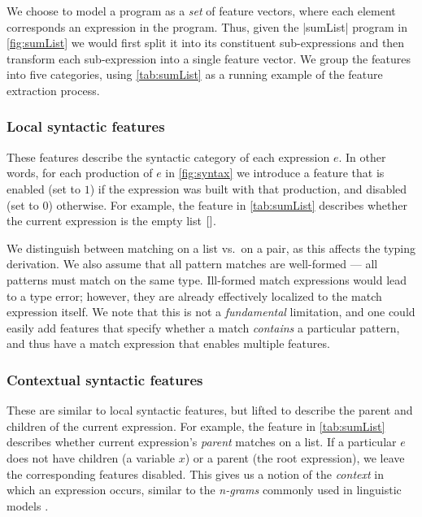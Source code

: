 We choose to model a program as a \emph{set} of feature vectors, where
each element corresponds an expression in the program.
%
Thus, given the |sumList| program in \autoref{fig:sumList} we
would first split it into its constituent sub-expressions and then
transform each sub-expression into a single feature vector.
%
We group the features into five categories, using \autoref{tab:sumList}
as a running example of the feature extraction process.

\subsubsection{Local syntactic features}
These features describe the syntactic category of each expression $e$.
%
In other words, for each production of $e$ in \autoref{fig:syntax} we
introduce a feature that is enabled (set to $1$) if the expression was
built with that production, and disabled (set to $0$) otherwise.
%
For example, the \IsNil feature in \autoref{tab:sumList} describes
whether the current expression is the empty list $\mathtt{[]}$.

We distinguish between matching on a list vs.\ on a pair, as this
affects the typing derivation.
%
We also assume that all pattern matches are well-formed --- \ie all
patterns must match on the same type.
%
Ill-formed match expressions would lead to a type error; however, they
are already effectively localized to the match expression itself.
%
We note that this is not a \emph{fundamental} limitation, and one could
easily add features that specify whether a match \emph{contains} a
particular pattern, and thus have a match expression that enables multiple
features.

\subsubsection{Contextual syntactic features}
These are similar to local syntactic features, but lifted to describe the
parent and children of the current expression.
%
For example, the \IsCaseListP feature in \autoref{tab:sumList} describes
whether current expression's \emph{parent} matches on a list.
%
If a particular $e$ does not have children (\eg a variable $x$) or a
parent (\ie the root expression), we leave the corresponding features
disabled.
%
This gives us a notion of the \emph{context} in which an expression
occurs, similar to the \emph{n-grams} commonly used in linguistic
models \citep{Hindle2012-hf,Gotterbarn1998-gc}.


